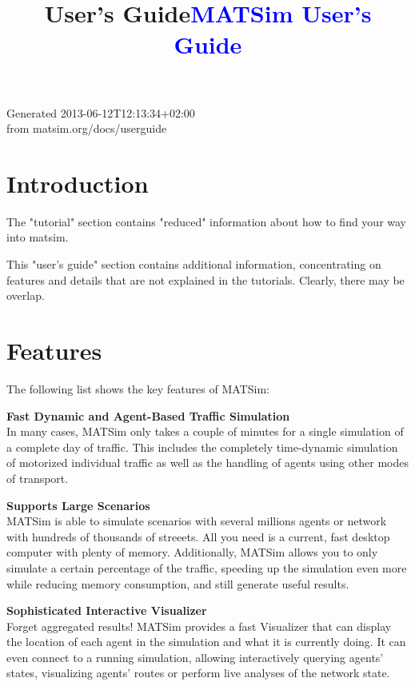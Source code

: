 \documentclass[a4paper,11pt]{report}
\title{User's Guide}
\begin{document}

\title{\textcolor{blue}{\sf MATSim User's Guide}}
\maketitle

\tableofcontents

Generated 2013-06-12T12:13:34+02:00
\\from matsim.org/docs/userguide



\chapter{Introduction}

The "tutorial" section contains "reduced" information about how to find your way into matsim.

This "user's guide" section contains additional information,  concentrating on features and details that are not explained in the  tutorials. Clearly, there may be overlap.

\chapter{Features}

The following list shows the key features of MATSim:

\textbf{Fast Dynamic and Agent-Based Traffic Simulation}
\\  In many cases, MATSim only takes a couple of minutes for a single  simulation of a complete day of traffic. This includes the completely  time-dynamic simulation of motorized individual traffic as well as the  handling of agents using other modes of transport.

\textbf{Supports Large Scenarios}
\\  MATSim is able to simulate scenarios with several millions agents or  network with hundreds of thousands of streeets. All you need is a  current, fast desktop computer with plenty of memory. Additionally,  MATSim allows you to only simulate a certain percentage of the traffic,  speeding up the simulation even more while reducing memory consumption,  and still generate useful results.

\textbf{Sophisticated Interactive Visualizer}
\\  Forget aggregated results! MATSim provides a fast Visualizer that can  display the location of each agent in the simulation and what it is  currently doing. It can even connect to a running simulation, allowing  interactively querying agents' states, visualizing agents' routes or  perform live analyses of the network state.
\end{document}
